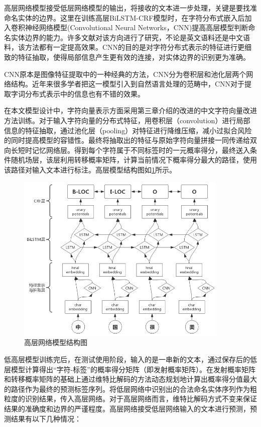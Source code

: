 \documentclass[winfonts,master,oneside,nobackinfo]{njuthesis}
\begin{document}
高层网络模型接受低层网络模型的输出，将接收的文本进一步处理，关键是要找准命名实体的边界。这里在训练高层BiLSTM-CRF模型时，在字符分布式嵌入后加入卷积神经网络模型(Convolutional Neural Networks，CNN)提高高层模型判断命名实体边界的能力。许多文献对该方向进行了研究\cite{Ma,kang}，不论是英文语料\cite{Zenan}还是中文语料\cite{Yaozong}，该方法都有一定提高效果。CNN的目的是对字符分布式表示的特征进行更细致的特征抽取，使得局部信息产生更有效的连接，对实体边界的识别更为准确。

CNN原本是图像特征提取中的一种经典的方法，CNN分为卷积层和池化层两个网络结构。近年来很多学者把这一模型引入到自然语言处理的范畴中，CNN对于提取字词分布式表示中的信息也有不错的效果。

在本文模型设计中，字符向量表示方面采用第三章介绍的改进的中文字符向量改进方法训练。对于输入字符向量的分布式特征，用卷积层（convolution）进行局部信息的特征抽取，通过池化层（pooling）对特征进行降维压缩，减小过拟合风险的同时提高模型的容错性。最终将抽取出的特征与原始字符向量拼接一同传递给双向长短时记忆网络层。得到每个字符属于不同标签时的一元概率得分，最终送入条件随机场层，该层利用转移概率矩阵，计算当前情况下概率得分最大的路径，使用该路径对输入文本进行标注。高层模型结构图如\ref{high-level}所示。

\begin{figure}[h]
\centering
\includegraphics[width=0.9\textwidth]{./figure/CNN辅助.jpg}
\caption{高层网络模型结构图}
\label{high-level}
\end{figure}

低高层模型训练完后，在测试使用阶段，输入的是一串新的文本，通过保存后的低层模型计算得出“字符-标签”的概率得分矩阵（即发射概率矩阵）。在发射概率矩阵和转移概率矩阵的基础上通过维特比解码的方法动态规划地计算出概率得分值最大的路径作为最终的预测标签序列。将低层网络中识别出的合法命名实体序列作为粗粒度的识别结果，传入高层网络。对于高层网络而言，维特比解码方式不变来保证结果的准确度和边界的严谨程度。高层网络接受低层网络输入的文本进行预测，预测结果有以下几种情况：
\end{document}
